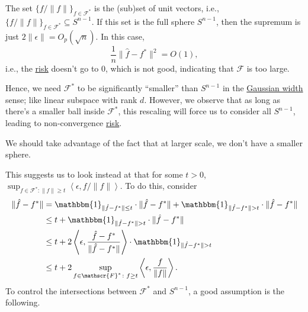 \begin{note}
	The set \(\{ f / \lVert f \rVert \} _{f\in \mathscr{F} ^{\ast} }\) is the (sub)set of unit vectors, i.e., \(\{ f / \lVert f \rVert \} _{f\in \mathscr{F} ^{\ast} } \subseteq S^{n-1}\). If this set is the full sphere \(S^{n-1}\), then the supremum is just \(2 \lVert \epsilon \rVert = O_p (\sqrt{n} )\). In this case,
	\[
		\frac{1}{n} \lVert \hat{f} - f^{\ast}  \rVert ^2 = O(1),
	\]
	i.e., the \hyperref[not:risk]{risk} doesn't go to \(0\), which is not good, indicating that \(\mathscr{F} \) is too large.
\end{note}

Hence, we need \(\mathscr{F} ^{\ast} \) to be significantly ``smaller'' than \(S^{n-1}\) in the \hyperref[def:Gaussian-width]{Gaussian width} sense; like linear subspace with rank \(d\). However, we observe that as long as there's a smaller ball inside \(\mathscr{F} ^{\ast} \), this rescaling will force us to consider all \(S^{n-1}\), leading to non-convergence \hyperref[not:risk]{risk}.

\begin{center}
\end{center}

\begin{intuition}
	We should take advantage of the fact that at larger scale, we don't have a smaller sphere.
\end{intuition}

This suggests us to look instead at that for some \(t > 0\), \(\sup _{f\in \mathscr{F} ^{\ast} \colon \lVert f \rVert \geq t} \left\langle \epsilon , f / \lVert f \rVert \right\rangle \). To do this, consider
\[
	\begin{split}
		\lVert \hat{f} - f^{\ast} \rVert
		&= \mathbbm{1}_{\lVert \hat{f} - f^{\ast} \rVert \leq t} \cdot \lVert \hat{f} - f^{\ast} \rVert + \mathbbm{1}_{\lVert \hat{f} - f^{\ast} \rVert > t} \cdot \lVert \hat{f} - f^{\ast} \rVert \\
		&\leq t + \mathbbm{1}_{\lVert \hat{f} - f^{\ast} \rVert > t} \cdot \lVert \hat{f} - f^{\ast} \rVert \\
		&\leq t + 2 \left\langle \epsilon , \frac{\hat{f} - f^{\ast} }{\lVert \hat{f} - f^{\ast} \rVert } \right\rangle \cdot \mathbbm{1}_{\lVert \hat{f} - f^{\ast} \rVert > t} \\
		&\leq t + 2 \sup _{\substack{f \in\mathscr{F} ^{\ast} \colon f \geq t}} \left\langle \epsilon , \frac{f}{\lVert f \rVert } \right\rangle .
	\end{split}
\]
To control the intersections between \(\mathscr{F} ^{\ast} \) and \(S^{n-1}\), a good assumption is the following.

